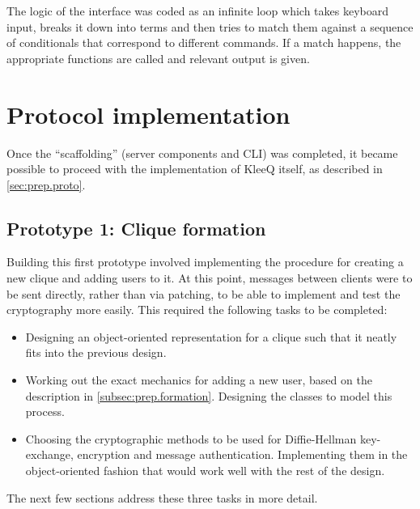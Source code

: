 \documentclass[a4paper, 12pt]{report}
\begin{document}
The logic of the interface was coded as an infinite loop which takes keyboard input, breaks it down into terms and then tries to match them against a sequence of conditionals that correspond to different commands. If a match happens, the appropriate functions are called and relevant output is given.


\section{Protocol implementation}
\label{sec:impl.proto}
Once the ``scaffolding'' (server components and CLI) was completed, it became possible to proceed with the implementation of KleeQ itself, as described in \cref{sec:prep.proto}.


\subsection{Prototype 1: Clique formation}
\label{subsec:impl.proto.formation}
Building this first prototype involved implementing the procedure for creating a new clique and adding users to it. At this point, messages between clients were to be sent directly, rather than via patching, to be able to implement and test the cryptography more easily. This required the following tasks to be completed:

\begin{itemize}
    \item Designing an object-oriented representation for a clique such that it neatly fits into the previous design.
    \item Working out the exact mechanics for adding a new user, based on the description in \cref{subsec:prep.formation}. Designing the classes to model this process.
    \item Choosing the cryptographic methods to be used for Diffie-Hellman key-exchange, encryption and message authentication. Implementing them in the object-oriented fashion that would work well with the rest of the design.
\end{itemize}

The next few sections address these three tasks in more detail.
\end{document}
